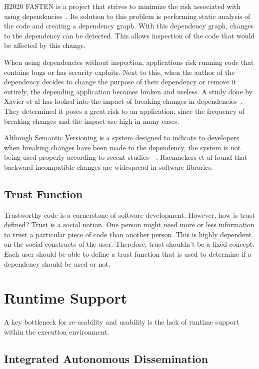 H2020 FASTEN is a project that strives to minimize the risk associated with using dependencies~\cite{fasten}. Its solution to this problem is performing static analysis of the code and creating a dependency graph. With this dependency graph, changes to the dependency can be detected. This allows inspection of the code that would be affected by this change.

When using dependencies without inspection, applications risk running code that contains bugs or has security exploits. Next to this, when the author of the dependency decides to change the purpose of their dependency or remove it entirely, the depending application becomes broken and useless. A study done by Xavier et al has looked into the impact of breaking changes in dependencies~\cite{xavier2017historical}. They determined it poses a great risk to an application, since the frequency of breaking changes and the impact are high in many cases.

Although Semantic Versioning is a system designed to indicate to developers when breaking changes have been made to the dependency, the system is not being used properly according to recent studies~\cite{raemaekers2014semantic}~\cite{raemaekers2017semantic}. Raemaekers et al found that backward-incompatible changes are widespread in software libraries.

\subsection*{Trust Function}
Trustworthy code is a cornerstone of software development. However, how is trust defined? Trust is a social notion. One person might need more or less information to trust a particular piece of code than another person. This is highly dependent on the social constructs of the user. Therefore, trust shouldn't be a fixed concept. Each user should be able to define a trust function that is used to determine if a dependency should be used or not.

\section{Runtime Support}

A key bottleneck for re-usability and usability is the lack of runtime support within the execution environment.

\subsection*{Integrated Autonomous Dissemination}

